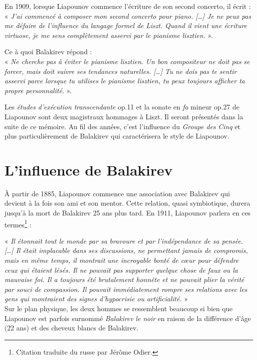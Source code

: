 \indent En 1909, lorsque Liapounov commence l'écriture de son second concerto, il écrit :\\
\indent« \emph{J'ai commencé à composer mon second concerto pour piano. [\dots] Je ne peux pas me défaire de l'influence du langage formel de Liszt. Quand il vient une écriture virtuose, je me sens complètement asservi par le pianisme lisztien.} ».\\

\vspace*{-0.25cm}

\indent Ce à quoi Balakirev répond :\\
\indent« \emph{Ne cherche pas à éviter le pianisme lisztien. Un bon compositeur ne doit pas se forcer, mais doit suivre ses tendances naturelles. [\dots] Tu ne dois pas te sentir asservi parce lorsque tu utilises le pianisme lisztien, tu peux toujours afficher ta propre personnalité.} ».

Les \emph{études d'exécution transcendante} op.11 et la sonate en \emph{fa} mineur op.27 de Liapounov sont deux magistraux hommages à Liszt. Il seront présentés dans la suite de ce mémoire. Au fil des années, c'est l'influence du \emph{Groupe des Cinq} et plus particulièrement de Balakirev qui caractérisera le style de Liapounov.

\section{L'influence de Balakirev}

À partir de 1885, Liapounov commence une association avec Balakirev qui devient à la fois son ami et son mentor. Cette relation, quasi symbiotique, durera jusqu'à la mort de Balakirev 25 ans plus tard. En 1911, Liapounov parlera en ces termes\footnote{Citation traduite du russe par Jérôme Odier.} :

« \emph{Il étonnait tout le monde par sa bravoure et par l'indépendance de sa pensée. [\dots] Il était implacable dans ses discussions, ne permettant jamais de compromis, mais en même temps, il montrait une incroyable bonté de cœur pour défendre ceux qui étaient lésés. Il ne pouvait pas supporter quelque chose de faux ou la mauvaise foi. Il a toujours été brutalement honnête et ne pouvait plier la vérité par souci de compassion. Il pouvait immédiatement rompre ses relations avec les gens qui montraient des signes d'hypocrisie ou artificialité.} »\\

Sur le plan physique, les deux hommes se ressemblent beaucoup si bien que Liapounov est parfois surnommé \emph{Balakirev le noir} en raison de la différence d'âge (22 ans) et des cheveux blancs de Balakirev.

